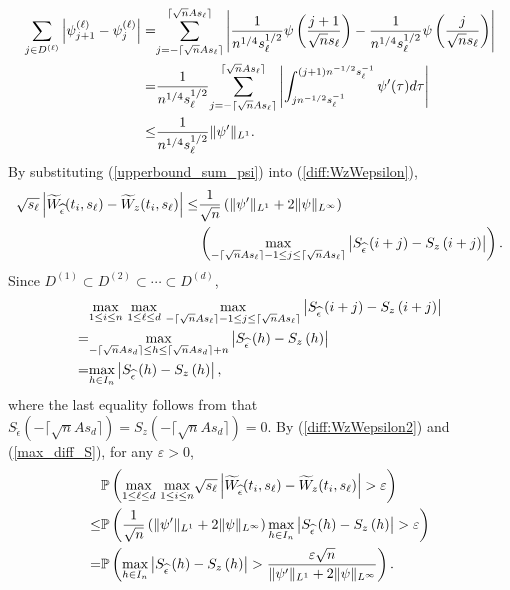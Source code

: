 \documentclass{amsart}
\begin{document}
\begin{align}\notag
\underset{j\in D^{(\ell)}}{\sum}\left|\psi^{(\ell)}_{j+1}-\psi^{(\ell)}_{j}\right|
=&\overset{\lceil \sqrt{n}As_{\ell}\rceil}{\underset{j=-\lceil \sqrt{n}As_{\ell}\rceil}{\sum}}
\left|\frac{1}{n^{1/4}s_{\ell}^{1/2}}\psi\left(\frac{j+1}{\sqrt{n}s_{\ell}}\right)-\frac{1}{n^{1/4}s_{\ell}^{1/2}}
\psi\left(\frac{j}{\sqrt{n}s_{\ell}}\right)\right|
\\\notag=&
\frac{1}{n^{1/4}s_{\ell}^{1/2}}\overset{\lceil \sqrt{n}As_{\ell}\rceil}{\underset{j=-\lceil \sqrt{n}As_{\ell}\rceil}{\sum}}
\left|\int_{jn^{-1/2}s_{\ell}^{-1}}^{(j+1)n^{-1/2}s_{\ell}^{-1}}
\psi'(\tau)d\tau\right|
\\\label{upperbound_sum_psi}\leq&\frac{1}{n^{1/4}s_{\ell}^{1/2}}
\|\psi'\|_{L^{1}}.
\end{align}
By substituting (\ref{upperbound_sum_psi}) into (\ref{diff:WzWepsilon}),
\begin{align}\notag
\sqrt{s_{\ell}}\left|\widetilde{W}_{\widehat{\epsilon}}(t_{i},s_{\ell}) -\widetilde{W}_{z}(t_{i},s_{\ell})\right|
\leq& \frac{1}{\sqrt{n}}\left(\|\psi'\|_{L^{1}}+2\|\psi\|_{L^{\infty}}\right)
\\\label{diff:WzWepsilon2}&\left(\underset{-\lceil \sqrt{n}As_{\ell}\rceil-1 \leq j\leq \lceil \sqrt{n}As_{\ell}\rceil}{\max}\left|S_{\widehat{\epsilon}}\left(i+j\right) -S_{z}\left(i+j\right)\right|\right).
\end{align}
Since $D^{(1)}\subset D^{(2)}\subset\cdots\subset D^{(d)}$,
\begin{align}\notag
&\underset{1\leq i \leq n}{\max}\ \underset{1\leq \ell \leq d}{\max}\ \underset{-\lceil \sqrt{n}As_{\ell}\rceil-1 \leq j\leq \lceil \sqrt{n}As_{\ell}\rceil}{\max}\left|S_{\widehat{\epsilon}}\left(i+j\right) -S_{z}\left(i+j\right)\right|
\\\notag=&\underset{-\lceil \sqrt{n}As_{d}\rceil \leq h\leq \lceil \sqrt{n}As_{d}\rceil+n}{\max}\left|S_{\widehat{\epsilon}}\left(h\right) -S_{z}\left(h\right)\right|
\\\label{max_diff_S}=&\underset{h\in I_{n}}{\max}\left|S_{\widehat{\epsilon}}\left(h\right) -S_{z}\left(h\right)\right|,
\end{align}
where the last equality follows from that
$S_{\widehat{\epsilon}}(-\lceil \sqrt{n}As_{d}\rceil)=S_{z}(-\lceil \sqrt{n}As_{d}\rceil)=0$.
By (\ref{diff:WzWepsilon2}) and (\ref{max_diff_S}), for any $\varepsilon> 0$,
\begin{align}\notag
&\mathbb{P}\left(\underset{1\leq \ell \leq d}{\max}\ \underset{1\leq i\leq n}{\max}\sqrt{s_{\ell}}\left|\widetilde{W}_{\widehat{\epsilon}}(t_{i},s_{\ell})
-\widetilde{W}_{z}(t_{i},s_{\ell})\right|>\varepsilon\right)
\\\notag\leq&
\mathbb{P}\left( \frac{1}{\sqrt{n}}\left(\|\psi'\|_{L^{1}}+2\|\psi\|_{L^{\infty}}\right)\underset{h\in I_{n}}{\max}\left|S_{\widehat{\epsilon}}\left(h\right) -S_{z}\left(h\right)\right|>\varepsilon\right)
\\\label{control:1}=&
\mathbb{P}\left( \underset{h\in I_{n}}{\max}\left|S_{\widehat{\epsilon}}\left(h\right) -S_{z}\left(h\right)\right|>\frac{\varepsilon \sqrt{n}}{\|\psi'\|_{L^{1}}+2\|\psi\|_{L^{\infty}}}\right).
\end{align}
\end{document}
